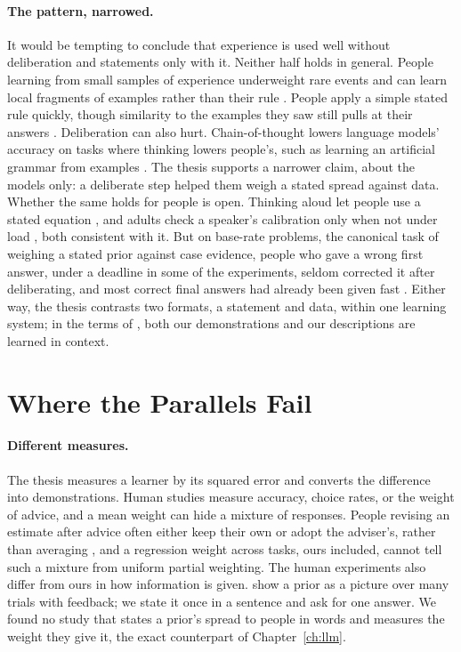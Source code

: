 \paragraph{The pattern, narrowed.} It would be tempting to conclude that experience is used well without deliberation and statements only with it. Neither half holds in general. People learning from small samples of experience underweight rare events \citep{hertwig2004} and can learn local fragments of examples rather than their rule \citep{perruchet1990}. People apply a simple stated rule quickly, though similarity to the examples they saw still pulls at their answers \citep{hahn2010}. Deliberation can also hurt. Chain-of-thought lowers language models' accuracy on tasks where thinking lowers people's, such as learning an artificial grammar from examples \citep{liu2025mind}. The thesis supports a narrower claim, about the models only: a deliberate step helped them weigh a stated spread against data. Whether the same holds for people is open. Thinking aloud let people use a stated equation \citep{berry1984}, and adults check a speaker's calibration only when not under load \citep{tenney2011}, both consistent with it. But on base-rate problems, the canonical task of weighing a stated prior against case evidence, people who gave a wrong first answer, under a deadline in some of the experiments, seldom corrected it after deliberating, and most correct final answers had already been given fast \citep{bago2017}. Either way, the thesis contrasts two formats, a statement and data, within one learning system; in the terms of \citet{russin2025}, both our demonstrations and our descriptions are learned in context.

\section{Where the Parallels Fail}\label{sec:hl-limits}
\paragraph{Different measures.} The thesis measures a learner by its squared error and converts the difference into demonstrations. Human studies measure accuracy, choice rates, or the weight of advice, and a mean weight can hide a mixture of responses. People revising an estimate after advice often either keep their own or adopt the adviser's, rather than averaging \citep{soll2009}, and a regression weight across tasks, ours included, cannot tell such a mixture from uniform partial weighting. The human experiments also differ from ours in how information is given. \citet{acerbi2014} show a prior as a picture over many trials with feedback; we state it once in a sentence and ask for one answer. We found no study that states a prior's spread to people in words and measures the weight they give it, the exact counterpart of Chapter~\ref{ch:llm}.

